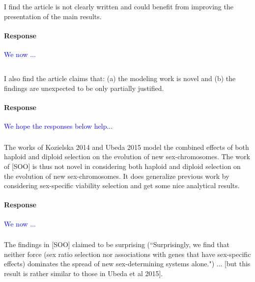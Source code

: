 \documentclass[10pt,letterpaper]{article}
\begin{document}
\noindent\subsection{}
I find the article is not clearly written and could benefit from improving the presentation of the main results. 

\noindent\paragraph{Response}
\textcolor{blue}{We now ...}

\noindent\subsection{}
I also find the article claims that: (a) the modeling work is novel and (b) the findings are unexpected to be only partially justified.

\noindent\paragraph{Response}
\textcolor{blue}{We hope the responses below help...}

\noindent\subsubsection{}
The works of Kozielska 2014 and Ubeda 2015 model the combined effects of both haploid and diploid selection on the evolution of new sex-chromosomes. The work of [SOO] is thus not novel in considering both haploid and diploid selection on the evolution of new sex-chromosomes. It does generalize previous work by considering sex-specific viability selection and get some nice analytical results.

\noindent\paragraph{Response}
\textcolor{blue}{We now ...}

\noindent\subsubsection{}
The findings in [SOO] claimed to be surprising (``Surprisingly, we find that neither force (sex ratio selection nor associations with genes that have sex-specific effects) dominates the spread of new sex-determining systems alone.") ... [but this result is rather similar to those in Ubeda et al 2015]. 
\end{document}
